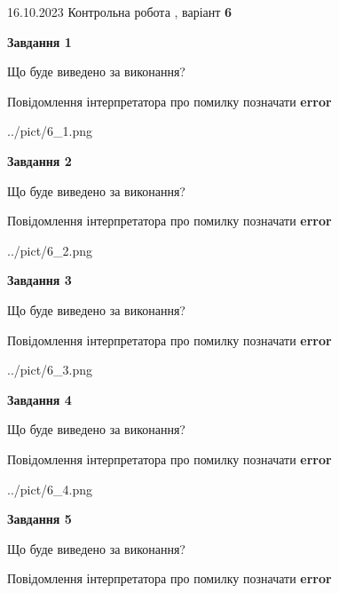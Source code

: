 \documentclass[12pt, ukrainian]{article}
\begin{document}
{\Large{16.10.2023 Контрольна робота , варіант  \No \textbf { 6 }\par}}
{
\begin {large}
{\begin {center}\textbf{Завдання 1}\end {center}}\par
Що буде виведено за виконання? \par
Повідомлення інтерпретатора про помилку позначати \textbf{error}

\begin{center}
	{../pict/6_1.png}
\end{center}
\newpage

{\begin {center}\textbf{Завдання 2}\end {center}}\par
Що буде виведено за виконання? \par
Повідомлення інтерпретатора про помилку позначати \textbf{error}

\begin{center}
	{../pict/6_2.png}
\end{center}
\newpage

{\begin {center}\textbf{Завдання 3}\end {center}}\par
Що буде виведено за виконання? \par
Повідомлення інтерпретатора про помилку позначати \textbf{error}

\begin{center}
	{../pict/6_3.png}
\end{center}
\newpage

{\begin {center}\textbf{Завдання 4}\end {center}}\par
Що буде виведено за виконання? \par
Повідомлення інтерпретатора про помилку позначати \textbf{error}

\begin{center}
	{../pict/6_4.png}
\end{center}
\newpage

{\begin {center}\textbf{Завдання 5}\end {center}}\par
Що буде виведено за виконання? \par
Повідомлення інтерпретатора про помилку позначати \textbf{error}


\end{large}}
\end{document}
